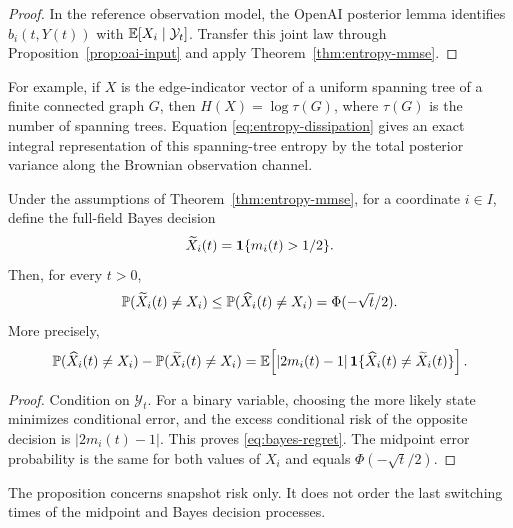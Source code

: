 \begin{proof}
In the reference observation model, the OpenAI posterior lemma identifies
$b_i(t,Y(t))$ with $\E[X_i\mid\mathcal Y_t]$.  Transfer this joint law through
Proposition~\ref{prop:oai-input} and apply Theorem~\ref{thm:entropy-mmse}.
\end{proof}

For example, if $X$ is the edge-indicator vector of a uniform spanning tree
of a finite connected graph $G$, then $H(X)=\log\tau(G)$, where $\tau(G)$ is
the number of spanning trees.  Equation \eqref{eq:entropy-dissipation} gives
an exact integral representation of this spanning-tree entropy by the total
posterior variance along the Brownian observation channel.

\begin{proposition}\label{prop:bayes-benchmark}
Under the assumptions of Theorem~\ref{thm:entropy-mmse}, for a coordinate
$i\in I$, define the full-field Bayes decision
\[
 \widetilde X_i(t)=\1\{m_i(t)>1/2\}.
\]
Then, for every $t>0$,
\begin{equation}\label{eq:bayes-benchmark}
 \P(\widetilde X_i(t)\ne X_i)
 \le \P(\widehat X_i(t)\ne X_i)
 =\Phi(-\sqrt t/2).
\end{equation}
More precisely,
\begin{equation}\label{eq:bayes-regret}
 \P(\widehat X_i(t)\ne X_i)-\P(\widetilde X_i(t)\ne X_i)
 =\E\!\left[|2m_i(t)-1|\,
   \1\{\widehat X_i(t)\ne\widetilde X_i(t)\}\right].
\end{equation}
\end{proposition}

\begin{proof}
Condition on $\mathcal Y_t$.  For a binary variable, choosing the more likely
state minimizes conditional error, and the excess conditional risk of the
opposite decision is $|2m_i(t)-1|$.  This proves
\eqref{eq:bayes-regret}.  The midpoint error probability is the same for both
values of $X_i$ and equals $\Phi(-\sqrt t/2)$.
\end{proof}

The proposition concerns snapshot risk only.  It does not order the last
switching times of the midpoint and Bayes decision processes.
